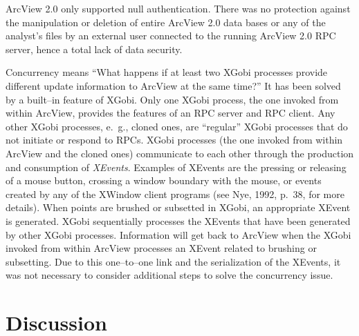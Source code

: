 ArcView 2.0 only supported null authentication. 
There was no protection against the manipulation or deletion of entire
ArcView 2.0 data bases or any of the analyst's files by an external
user connected to the running ArcView 2.0 RPC server, hence a total
lack of data security.  

Concurrency means ``What happens if at least two XGobi processes
provide different update information to ArcView at the same time?'' It
has been solved by a built--in feature of XGobi. Only one XGobi
process, the one invoked from within ArcView, provides the features of
an RPC server and RPC client. Any other XGobi processes, e.~g., cloned ones,
are ``regular'' XGobi processes
that do not initiate or respond to RPCs. XGobi processes (the one
invoked from within ArcView and the cloned ones) communicate to each
other through the production and consumption of {\it XEvents}.
Examples of XEvents are the
pressing or releasing of a mouse button, 
crossing a window boundary with the mouse, or events
created by any of the XWindow client programs 
(see Nye, 1992, p.\ 38, for more details).
When points are brushed or subsetted in XGobi, an appropriate XEvent is
generated. XGobi
sequentially processes the XEvents that have been generated by other
XGobi processes. Information will get back to ArcView when the XGobi
invoked from within ArcView processes an XEvent related to brushing or
subsetting.  Due to this
one--to--one link and the serialization of the XEvents, it was not
necessary to consider additional steps to solve the concurrency issue.


\section{Discussion}

